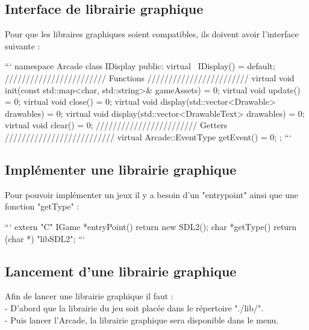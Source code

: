 \documentclass{report}
\begin{document}
\subsection{Interface de librairie graphique}

Pour que les libraires graphiques soient compatibles, ils doivent avoir l'interface suivante :

\begin{tcolorbox}[colback=black!75!white]
{\color{white}
\begin{markdown}
```
namespace Arcade {
    class IDisplay {
        public:
            virtual ~IDisplay() = default;
            //////////////////////// Functions ////////////////////////
            virtual void init(const std::map<char, std::string>& gameAssets) = 0;
            virtual void update() = 0;
            virtual void close() = 0;
            virtual void display(std::vector<Drawable> drawables) = 0;
            virtual void display(std::vector<DrawableText> drawables) = 0;
            virtual void clear() = 0;
            //////////////////////// Getters //////////////////////////
            virtual Arcade::EventType getEvent() = 0;
    };
}
```
\end{markdown}
}
\end{tcolorbox}

\subsection{Implémenter une librairie graphique}

Pour pouvoir implémenter un jeux il y a besoin d'un "entrypoint" ainsi que une fonction "getType" :

\begin{tcolorbox}[colback=black!75!white]
{\color{white}
\begin{markdown}
```
extern "C" {
    IGame *entryPoint()
    {
        return new SDL2();
    }
    char *getType()
    {
        return (char *) "libSDL2";
    }
}
```
\end{markdown}
}
\end{tcolorbox}

\subsection{Lancement d'une librairie graphique}
Afin de lancer une librairie graphique il faut : \\
\hspace*{1cm}- D'abord que la librairie du jeu soit placée dans le répertoire "./lib/". \\
\hspace*{1cm}- Puis lancer l'Arcade, la librairie graphique sera disponible dans le menu. \\
\end{document}
